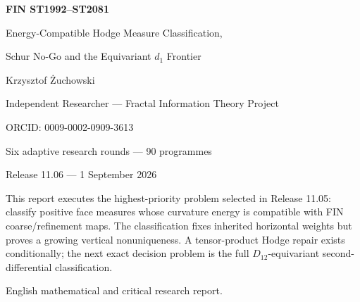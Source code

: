 \documentclass[11pt,a4paper]{article}
\begin{document}
\begin{titlepage}\centering\vspace*{14mm}
{\Huge\bfseries FIN ST1992--ST2081\par}\vspace{4mm}
{\LARGE Energy-Compatible Hodge Measure Classification,\par}\vspace{2mm}
{\LARGE Schur No-Go and the Equivariant $d_1$ Frontier\par}\vspace{12mm}
{\Large Krzysztof \.Zuchowski\par}
{\normalsize Independent Researcher --- Fractal Information Theory Project\par}
{\normalsize ORCID: 0009-0002-0909-3613\par}\vspace{9mm}
{\large Six adaptive research rounds --- 90 programmes\par}
{\large Release 11.06 --- 1 September 2026\par}
\vfill
\begin{minipage}{.87\textwidth}\small
This report executes the highest-priority problem selected in Release 11.05:
classify positive face measures whose curvature energy is compatible with FIN
coarse/refinement maps.  The classification fixes inherited horizontal
weights but proves a growing vertical nonuniqueness.  A tensor-product Hodge
repair exists conditionally; the next exact decision problem is the full
$D_{12}$-equivariant second-differential classification.
\end{minipage}\vfill
{\small English mathematical and critical research report.}
\end{titlepage}
\end{document}
